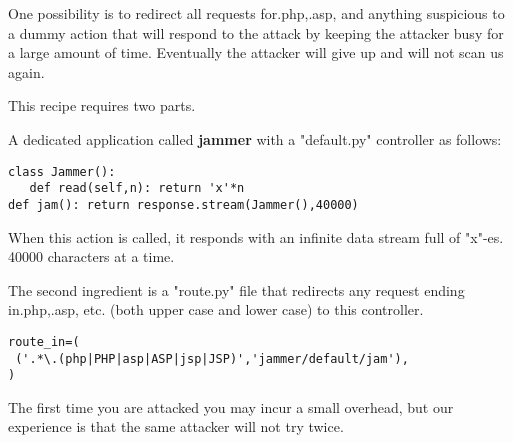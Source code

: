 \documentclass[justified,sixbynine,notoc]{tufte-book}
\begin{document}
\begin{fullwidth}
One possibility is to redirect all requests for.php,.asp, and anything suspicious to a dummy action that will respond to the attack by keeping the attacker busy for a large amount of time. Eventually the attacker will give up and will not scan us again.

This recipe requires two parts.

A dedicated application called {\bf jammer} with a "default.py" controller as follows:
\begin{lstlisting}
class Jammer():
   def read(self,n): return 'x'*n
def jam(): return response.stream(Jammer(),40000)
\end{lstlisting}

When this action is called, it responds with an infinite data stream full of "x"-es. 40000 characters at a time.

The second ingredient is a "route.py" file that redirects any request ending in.php,.asp, etc. (both upper case and lower case) to this controller.
\begin{lstlisting}
route_in=(
 ('.*\.(php|PHP|asp|ASP|jsp|JSP)','jammer/default/jam'),
)
\end{lstlisting}

The first time you are attacked you may incur a small overhead, but our experience is that the same attacker will not try twice.

\end{fullwidth}

\backmatter
\printindex
\end{document}
